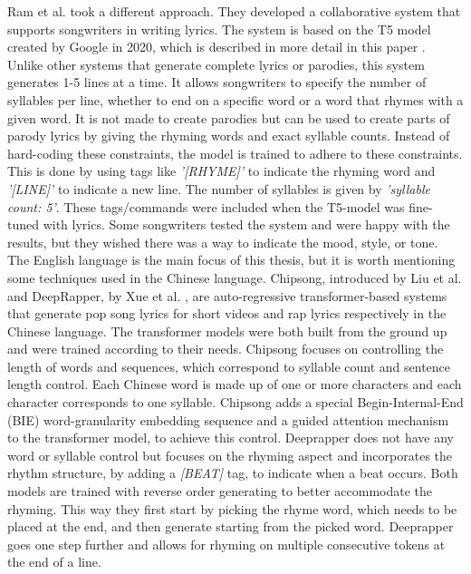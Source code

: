 \newline \newline
Ram et al. \cite{ram_say_2021} took a different approach. They developed a collaborative system that supports songwriters in writing lyrics. The system is based on the T5 model created by Google in 2020, which is described in more detail in this paper \cite{T5_raffel_exploring_2023}. Unlike other systems that generate complete lyrics or parodies, this system generates 1-5 lines at a time. It allows songwriters to specify the number of syllables per line, whether to end on a specific word or a word that rhymes with a given word. It is not made to create parodies but can be used to create parts of parody lyrics by giving the rhyming words and exact syllable counts. Instead of hard-coding these constraints, the model is trained to adhere to these constraints. This is done by using tags like \textit{'[RHYME]'} to indicate the rhyming word and \textit{'[LINE]'} to indicate a new line. The number of syllables is given by \textit{'syllable count: 5'}. These tags/commands were included when the T5-model was fine-tuned with lyrics. Some songwriters tested the system and were happy with the results, but they wished there was a way to indicate the mood, style, or tone.
\newline\newline
The English language is the main focus of this thesis, but it is worth mentioning some techniques used in the Chinese language. Chipsong, introduced by Liu et al. \cite{liu_chipsong_2022} and DeepRapper, by Xue et al. \cite{xue_deeprapper_2021}, are auto-regressive transformer-based systems that generate pop song lyrics for short videos and rap lyrics respectively in the Chinese language. The transformer models were both built from the ground up and were trained according to their needs. Chipsong focuses on controlling the length of words and sequences, which correspond to syllable count and sentence length control. Each Chinese word is made up of one or more characters and each character corresponds to one syllable. Chipsong adds a special  Begin-Internal-End (BIE) word-granularity embedding sequence and a guided attention mechanism to the transformer model, to achieve this control. Deeprapper does not have any word or syllable control but focuses on the rhyming aspect and incorporates the rhythm structure, by adding a \textit{[BEAT]} tag, to indicate when a beat occurs.  Both models are trained with reverse order generating to better accommodate the rhyming. This way they first start by picking the rhyme word, which needs to be placed at the end, and then generate starting from the picked word. Deeprapper goes one step further and allows for rhyming on multiple consecutive tokens at the end of a line. 


